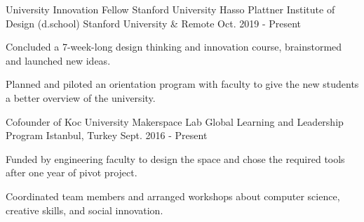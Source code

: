 \begin{cventries}
  \cvopenentry
    {University Innovation Fellow} %
    {Stanford University Hasso Plattner Institute of Design (d.school) } %
    {Stanford University \& Remote} %
    {Oct. 2019 - Present} %
    {
    \begin{cvitems} %
        \item {Concluded a 7-week-long design thinking and innovation course, brainstormed and launched new ideas.}
        \item {Planned and piloted an orientation program with faculty to give the new students a better overview of the university.}
     \end{cvitems}
    }
  \cvopenentry
    {Cofounder of Koc University Makerspace Lab} %
    {Global Learning and Leadership Program} %
    {Istanbul, Turkey} %
    {Sept. 2016 - Present} %
    {
      \begin{cvitems} %
        \item {Funded by engineering faculty to design the space and chose the required tools after one year of pivot project.}
        \item {Coordinated team members and arranged workshops about computer science, creative skills, and social innovation.}

\end{cvitems}}
\end{cventries}
